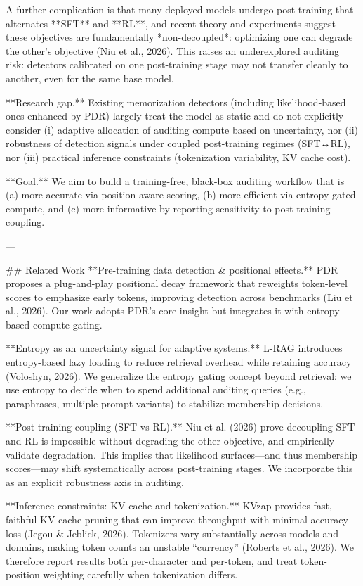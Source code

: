 A further complication is that many deployed models undergo post-training that alternates **SFT** and **RL**, and recent theory and experiments suggest these objectives are fundamentally *non-decoupled*: optimizing one can degrade the other’s objective (Niu et al., 2026). This raises an underexplored auditing risk: detectors calibrated on one post-training stage may not transfer cleanly to another, even for the same base model.

**Research gap.** Existing memorization detectors (including likelihood-based ones enhanced by PDR) largely treat the model as static and do not explicitly consider (i) adaptive allocation of auditing compute based on uncertainty, nor (ii) robustness of detection signals under coupled post-training regimes (SFT↔RL), nor (iii) practical inference constraints (tokenization variability, KV cache cost).

**Goal.** We aim to build a training-free, black-box auditing workflow that is (a) more accurate via position-aware scoring, (b) more efficient via entropy-gated compute, and (c) more informative by reporting sensitivity to post-training coupling.

---

## Related Work  
**Pre-training data detection & positional effects.** PDR proposes a plug-and-play positional decay framework that reweights token-level scores to emphasize early tokens, improving detection across benchmarks (Liu et al., 2026). Our work adopts PDR’s core insight but integrates it with entropy-based compute gating.

**Entropy as an uncertainty signal for adaptive systems.** L-RAG introduces entropy-based lazy loading to reduce retrieval overhead while retaining accuracy (Voloshyn, 2026). We generalize the entropy gating concept beyond retrieval: we use entropy to decide when to spend additional auditing queries (e.g., paraphrases, multiple prompt variants) to stabilize membership decisions.

**Post-training coupling (SFT vs RL).** Niu et al. (2026) prove decoupling SFT and RL is impossible without degrading the other objective, and empirically validate degradation. This implies that likelihood surfaces—and thus membership scores—may shift systematically across post-training stages. We incorporate this as an explicit robustness axis in auditing.

**Inference constraints: KV cache and tokenization.** KVzap provides fast, faithful KV cache pruning that can improve throughput with minimal accuracy loss (Jegou & Jeblick, 2026). Tokenizers vary substantially across models and domains, making token counts an unstable “currency” (Roberts et al., 2026). We therefore report results both per-character and per-token, and treat token-position weighting carefully when tokenization differs.

